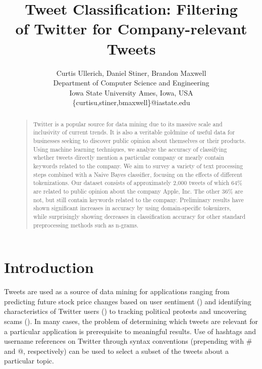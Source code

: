 \documentclass[letterpaper]{article}
\begin{document}
\title{Tweet Classification: Filtering \\ of Twitter for Company-relevant Tweets}
\author{
Curtis Ullerich, Daniel Stiner, Brandon Maxwell\\
Department of Computer Science and Engineering\\
Iowa State University
Ames, Iowa, USA\\
\{curtisu,stiner,bmaxwell\}@iastate.edu\\
}
\maketitle
\begin{abstract}
\begin{quote}
Twitter is a popular source for data mining due to its massive scale and inclusivity of current trends.
It is also a veritable goldmine of useful data for businesses seeking to discover public opinion about themselves or their products.
Using machine learning techniques, we analyze the accuracy of classifying whether tweets directly mention a particular company or mearly contain keywords related to the company.
We aim to survey a variety of text processing steps combined with a Naive Bayes classifier, focusing on the effects of different tokenizations.
Our dataset consists of approximately 2,000 tweets of which 64\% are related to public opinion about the company Apple, Inc. The other 36\% are not, but still contain keywords related to the company.
Preliminary results have shown significant increases in accuracy %
by using domain-specific tokenizers, while surprisingly showing decreases in classification accuracy for other standard preprocessing methods such as n-grams.%
\end{quote}
\end{abstract}

\section{Introduction}
Tweets are used as a source of data mining for applications ranging from predicting future stock price changes based on user sentiment (\citeauthor{Ruiz}) and identifying characteristics of Twitter users (\citeauthor{conf/icwsm/PennacchiottiP11}) to tracking political protests and uncovering scams (\citeauthor{ICWSM101540}).
In many cases, the problem of determining which tweets are relevant for a particular application is prerequisite to meaningful results. Use of hashtags and username references on Twitter through syntax conventions (prepending with \# and @, respectively) can be used to select a subset of the tweets about a particular topic. 
\end{document}
